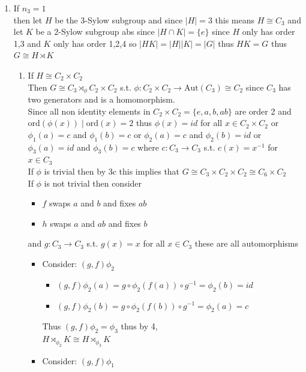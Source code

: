 \documentclass[12pt, letterpaper]{article}
\theoremstyle{definition}
\renewcommand{\t}[1]{\text{#1}}
\begin{document}
\begin{enumerate}
    \item If $n_3=1$\\
    then let $H$ be the 3-Sylow subgroup and since $|H|=3$ this means $H \cong C_3$ and let $K$ be a 2-Sylow subgroup abs since $|H \cap K|=\{e\}$ since $H$ only has order 1,3 and $K$ only has order 1,2,4 so $|HK|=|H||K|=|G|$ thus $HK=G$ thus  $G \cong H \rtimes K$
    \begin{enumerate}
        \item If $H \cong C_2 \times C_2$\\
        Then $G \cong C_3 \rtimes_{\phi} C_2 \times C_2$ s.t. $\phi : C_2 \times C_2 \rightarrow \t{Aut}(C_3) \cong C_2$ since $C_3$ has two generators and is a homomorphism.\\
        Since all non identity elements in $C_2 \times C_2=\{e,a,b,ab\}$ are order 2 and ord$(\phi(x)) \mid \t{ord}(x)=2$ thus $\phi(x)=id$ for all $x\in C_2 \times C_2$
        or $\phi_1(a)=c$ and $\phi_1(b)=c$ or $\phi_2(a)=c$ and $\phi_2(b)=id$ or $\phi_3(a)=id$ and $\phi_3(b)=c$ where $c : C_3 \rightarrow C_3$ s.t. $c(x)=x^{-1}$ for $x \in C_3$\\
        If $\phi$ is trivial then by 3c this implies that $G \cong C_3 \times C_2 \times C_2 \cong C_6 \times C_2$\\
        If $\phi$ is not trivial then consider
        \begin{itemize}
            \item $f$ swaps $a$ and $b$ and fixes $ab$
            \item $h$ swaps $a$ and $ab$ and fixes $b$
        \end{itemize}
        and $g : C_3 \rightarrow C_3$ s.t. $g(x)=x$ for all $x \in C_3$ these are all automorphisms
        \begin{itemize}
            \item Consider: $(g,f)\phi_2$
            \begin{itemize}
                \item $(g,f)\phi_2(a)=g \circ \phi_2(f(a))\circ g^{-1}=\phi_2(b)=id$
                \item $(g,f)\phi_2(b)=g \circ \phi_2(f(b))\circ g^{-1}=\phi_2(a)=c$
            \end{itemize}
            Thus $(g,f)\phi_2 = \phi_3$ thus by 4, \\$H \rtimes_{\phi_2} K \cong H \rtimes_{\phi_3} K$
            \item Consider: $(g,f)\phi_1$
            \begin{itemize}

\end{itemize}
\end{itemize}
\end{enumerate}
\end{enumerate}
\end{document}
